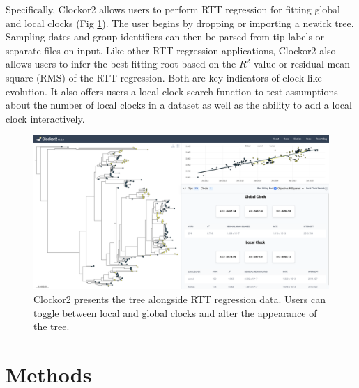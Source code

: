 \documentclass{article}
\begin{document}
Specifically, Clockor2 allows users to perform RTT regression for fitting global and local clocks (Fig \ref{fig:ui}). The user begins by dropping or importing a newick tree. Sampling dates and group identifiers can then be parsed from tip labels or separate files on input. Like other RTT regression applications, Clockor2 also allows users to infer the best fitting root based on the $R^2$ value or residual mean square (RMS) of the RTT regression. Both are key indicators of clock-like evolution. It also offers users a local clock-search function to test assumptions about the number of local clocks in a dataset as well as the ability to add a local clock interactively.

\begin{figure}[H]
\centering
\includegraphics[width = 1\linewidth]{clockor2UI.pdf}
\caption{Clockor2 presents the tree alongside RTT regression data. Users can toggle between local and global clocks and alter the appearance of the tree.}
\label{fig:ui}
\end{figure}

\section*{Methods}
\end{document}
